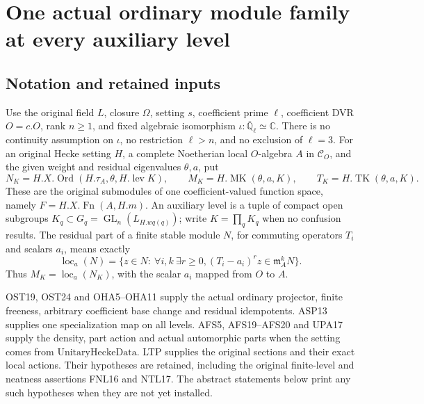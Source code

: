 \section{One actual ordinary module family at every auxiliary level}
\label{sec:hida-level-modules-v45}


\subsection{Notation and retained inputs}

Use the original field \(L\), closure \(\Omega\), setting \(s\),
coefficient prime \(\ell\), coefficient DVR \(O=c.O\), rank
\(n\geq1\), and fixed algebraic isomorphism
\(\iota:\overline{\mathbb Q}_\ell\simeq\mathbb C\).
There is no continuity assumption on \(\iota\), no restriction
\(\ell>n\), and no exclusion of \(\ell=3\).
For an original Hecke setting \(H\), a complete Noetherian local
\(O\)-algebra \(A\) in \(\mathcal C_O\), and the given weight
and residual eigenvalues \(\theta,a\), put
\[
 N_K=H.X.\operatorname{Ord}(H.\tau_A,\theta,H.\operatorname{lev}K),
 \qquad M_K=H.\operatorname{MK}(\theta,a,K),
 \qquad T_K=H.\operatorname{TK}(\theta,a,K).
 \tag{HLM.1}
\]
These are the original submodules of one coefficient-valued
function space, namely \(F=H.X.\operatorname{Fn}(A,H.m)\).
An auxiliary level is a tuple of compact open subgroups
\(K_q\subset G_q=\operatorname{GL}_n(L_{H.wq(q)})\);
write \(K=\prod_qK_q\) when no confusion results.
The residual part of a finite stable module \(N\), for commuting
operators \(T_i\) and scalars \(a_i\), means exactly
\[
 \operatorname{loc}_a(N)=
 \{z\in N:\ \forall i,k\ \exists r\geq0,
                    (T_i-a_i)^rz\in\mathfrak m_A^kN\}.
 \tag{HLM.2}
\]
Thus \(M_K=\operatorname{loc}_a(N_K)\), with the scalar
\(a_i\) mapped from \(O\) to \(A\).

OST19, OST24 and OHA5--OHA11 supply the actual ordinary projector,
finite freeness, arbitrary coefficient base change and residual
idempotents.  ASP13 supplies one specialization map on all levels.
AFS5, AFS19--AFS20 and UPA17 supply the density, part action and
actual automorphic parts when the setting comes from
\(\mathrm{UnitaryHeckeData}\).  LTP supplies the original sections
and their exact local actions.  Their hypotheses are retained,
including the original finite-level and neatness assertions FNL16
and NTL17.  The abstract statements below print any such hypotheses
when they are not yet installed.

